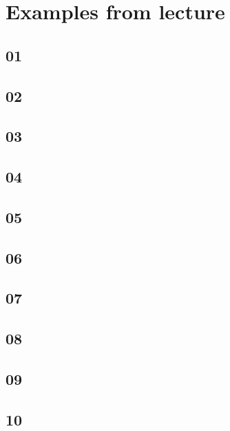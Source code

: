 \documentclass[../main.tex]{subfiles}
\begin{document}
\section{Examples from lecture}%
\label{sec:examples_from_lecture}



\subsection{01}%
\label{sub:01}


\subsection{02}%
\label{sub:02}


\subsection{03}%
\label{sub:03}


\subsection{04}%
\label{sub:04}


\subsection{05}%
\label{sub:05}


\subsection{06}%
\label{sub:06}


\subsection{07}%
\label{sub:07}


\subsection{08}%
\label{sub:08}


\subsection{09}%
\label{sub:09}


\subsection{10}%
\label{sub:10}

\end{document}
